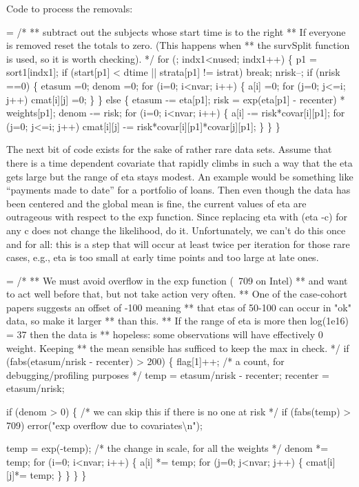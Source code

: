 \documentclass{article}
\begin{document}
Code to process the removals:
\begin{nwchunk}
=
 /*
 ** subtract out the subjects whose start time is to the right
 ** If everyone is removed reset the totals to zero.  (This happens when
 ** the survSplit function is used, so it is worth checking).
 */
 for (; indx1<nused; indx1++) \{
     p1 = sort1[indx1];
     if (start[p1] < dtime || strata[p1] != istrat) break;
     nrisk--;
     if (nrisk ==0) \{
         etasum =0;
         denom =0;
         for (i=0; i<nvar; i++) \{
             a[i] =0;
             for (j=0; j<=i; j++) cmat[i][j] =0;
         \}
     \}
     else \{
         etasum -= eta[p1];
         risk = exp(eta[p1] - recenter) * weights[p1];
         denom -= risk;
         for (i=0; i<nvar; i++) \{
             a[i] -= risk*covar[i][p1];
             for (j=0; j<=i; j++)
                 cmat[i][j] -= risk*covar[i][p1]*covar[j][p1];
         \}
     \}
 \}
\end{nwchunk}

The next bit of code exists for the sake of rather rare data sets.
Assume that there is a time dependent covariate that rapidly climbs 
in such a way that the eta gets large but the range of eta stays
modest.  An example would be something like ``payments made to date'' for
a portfolio of loans.  Then even though the data has been centered and
the global mean is fine, the current values of eta are outrageous with
respect to the exp function.
Since replacing eta with (eta -c) for any c does not change the likelihood,
do it.  Unfortunately, we can't do this once and for all: this is a step that 
will occur at least twice per iteration for those rare cases, e.g., eta is
too small at early time points and too large at late ones.
\begin{nwchunk}
=
 /* 
 ** We must avoid overflow in the exp function (~709 on Intel)
 ** and want to act well before that, but not take action very often.  
 ** One of the case-cohort papers suggests an offset of -100 meaning
 ** that etas of 50-100 can occur in "ok" data, so make it larger 
 ** than this.
 ** If the range of eta is more then log(1e16) = 37 then the data is
 **  hopeless: some observations will have effectively 0 weight.  Keeping
 **  the mean sensible has sufficed to keep the max in check.
 */
 if (fabs(etasum/nrisk - recenter) > 200) \{  
     flag[1]++;  /* a count, for debugging/profiling purposes */
     temp = etasum/nrisk - recenter;
     recenter = etasum/nrisk;
 
     if (denom > 0) \{
         /* we can skip this if there is no one at risk */
         if (fabs(temp) > 709) error("exp overflow due to covariates{\textbackslash}n");
              
         temp = exp(-temp);  /* the change in scale, for all the weights */
         denom *= temp;
         for (i=0; i<nvar; i++) \{
             a[i] *= temp;
             for (j=0; j<nvar; j++) \{
                 cmat[i][j]*= temp;
             \}
         \}
     \}       
 \}
\end{nwchunk}
\end{document}
